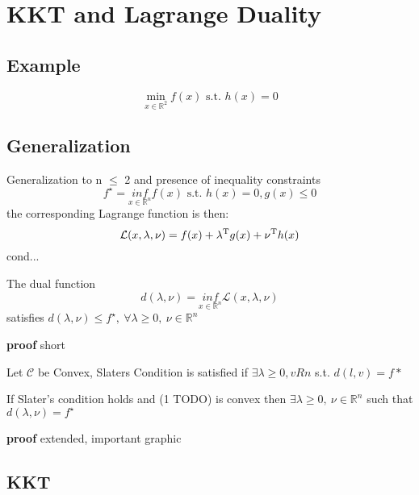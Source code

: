 \section{KKT and Lagrange Duality}

\subsection{Example}


$$\min _{x \in \mathcal{\mathbb{R}^2}} f(x) \text{ s.t. } h(x)=0$$

\subsection{Generalization}
Generalization to n $\le$ 2 and presence of inequality constraints
\[
	f^\star = \underset{x \in \mathcal{\mathbb{R}}^n}{inf}f(x)
	\text{ s.t. }
	h(x)=0, g(x) \le 0
\]
\rightarrow \quad  the corresponding Lagrange function is  then:
\[
	\mathcal{L}(x,\lambda,\nu) = f(x) + \lambda^{\textnormal{\scriptsize T}}g(x)+\nu^{\textnormal{\scriptsize T}}h(x)
\]
cond...

\begin{proposition}
	The  dual function
	$$d(\lambda,\nu) = \underset{x \in \mathcal{\mathbb{R}}^n}{inf}\mathcal{L}(x,\lambda,\nu)$$
	satisfies $d(\lambda,\nu)\le f^\star,\ \forall \lambda\ge 0,\ \nu \in \mathbb{R}^{n}$

\end{proposition}

\textbf{proof} short

\begin{definition}
	Let $\mathcal{C}$ be Convex, Slaters Condition is satisfied if
	$\exists \lambda \ge 0, vRn$ s.t. $d(l,v)=f*$
\end{definition}

\begin{proposition}
	If Slater's condition holds and (1 TODO) is convex then
	$\exists \lambda\ge 0,\ \nu \in \mathbb{R}^{n}$
	such that  $d(\lambda,\nu)= f^\star$
\end{proposition}

\textbf{proof} extended, important  graphic

\subsection{KKT}

